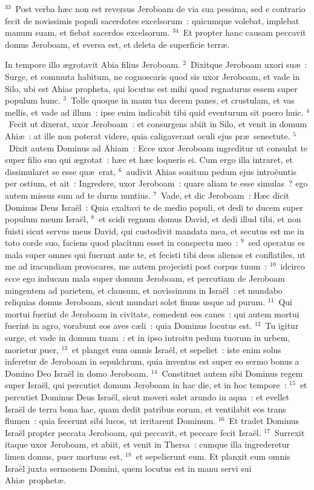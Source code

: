 ${}^{33}$~Post verba h\ae c non est reversus Jeroboam de via sua pessima, sed e contrario fecit de novissimis populi sacerdotes excelsorum~: quicumque volebat, implebat manum suam, et fiebat sacerdos excelsorum.
${}^{34}$~Et propter hanc causam peccavit domus Jeroboam, et eversa est, et deleta de superficie terr\ae .

\bchapter
\lettrine[lines=3,image=true,loversize=0.05,lraise=-0.03]{I}{}n tempore illo \ae grotavit Abia filius Jeroboam.
${}^{2}$~Dixitque Jeroboam uxori su\ae~: Surge, et commuta habitum, ne cognoscaris quod sis uxor Jeroboam, et vade in Silo, ubi est Ahias propheta, qui locutus est mihi quod regnaturus essem super populum hunc.
${}^{3}$~Tolle quoque in manu tua decem panes, et crustulam, et vas mellis, et vade ad illum~: ipse enim indicabit tibi quid eventurum sit puero huic.
${}^{4}$~Fecit ut dixerat, uxor Jeroboam~: et consurgens abiit in Silo, et venit in domum Ahi\ae~: at ille non poterat videre, quia caligaverant oculi ejus pr\ae\ senectute.
${}^{5}$~Dixit autem Dominus ad Ahiam~: Ecce uxor Jeroboam ingreditur ut consulat te super filio suo qui \ae grotat~: h\ae c et h\ae c loqueris ei. Cum ergo illa intraret, et dissimularet se esse qu\ae\ erat,
${}^{6}$~audivit Ahias sonitum pedum ejus intro\"euntis per ostium, et ait~: Ingredere, uxor Jeroboam~: quare aliam te esse simulas~? ego autem missus sum ad te durus nuntius.
${}^{7}$~Vade, et dic Jeroboam~: H\ae c dicit Dominus Deus Isra\"el~: Quia exaltavi te de medio populi, et dedi te ducem super populum meum Isra\"el,
${}^{8}$~et scidi regnum domus David, et dedi illud tibi, et non fuisti sicut servus meus David, qui custodivit mandata mea, et secutus est me in toto corde suo, faciens quod placitum esset in conspectu meo~:
${}^{9}$~sed operatus es mala super omnes qui fuerunt ante te, et fecisti tibi deos alienos et conflatiles, ut me ad iracundiam provocares, me autem projecisti post corpus tuum~:
${}^{10}$~idcirco ecce ego inducam mala super domum Jeroboam, et percutiam de Jeroboam mingentem ad parietem, et clausum, et novissimum in Isra\"el~: et mundabo reliquias domus Jeroboam, sicut mundari solet fimus usque ad purum.
${}^{11}$~Qui mortui fuerint de Jeroboam in civitate, comedent eos canes~: qui autem mortui fuerint in agro, vorabunt eos aves c\ae li~: quia Dominus locutus est.
${}^{12}$~Tu igitur surge, et vade in domum tuam~: et in ipso introitu pedum tuorum in urbem, morietur puer,
${}^{13}$~et planget eum omnis Isra\"el, et sepeliet~: iste enim solus inferetur de Jeroboam in sepulchrum, quia inventus est super eo sermo bonus a Domino Deo Isra\"el in domo Jeroboam.
${}^{14}$~Constituet autem sibi Dominus regem super Isra\"el, qui percutiet domum Jeroboam in hac die, et in hoc tempore~:
${}^{15}$~et percutiet Dominus Deus Isra\"el, sicut moveri solet arundo in aqua~: et evellet Isra\"el de terra bona hac, quam dedit patribus eorum, et ventilabit eos trans flumen~: quia fecerunt sibi lucos, ut irritarent Dominum.
${}^{16}$~Et tradet Dominus Isra\"el propter peccata Jeroboam, qui peccavit, et peccare fecit Isra\"el.
${}^{17}$~Surrexit itaque uxor Jeroboam, et abiit, et venit in Thersa~: cumque illa ingrederetur limen domus, puer mortuus est,
${}^{18}$~et sepelierunt eum. Et planxit eum omnis Isra\"el juxta sermonem Domini, quem locutus est in manu servi sui Ahi\ae\ prophet\ae .


